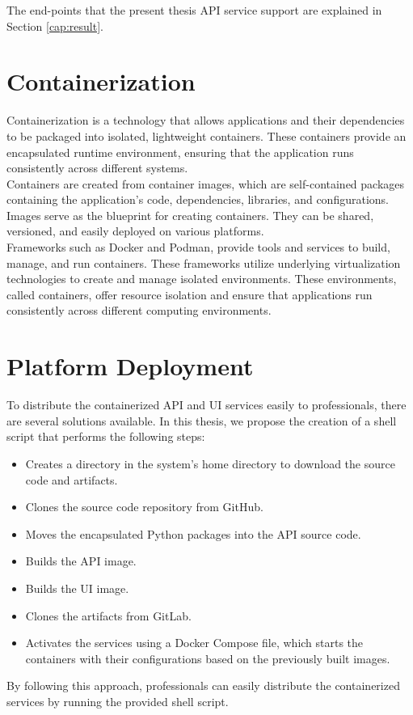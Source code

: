 The end-points that the present thesis API service support are explained in
Section \ref{cap:result}.

\section{Containerization}

Containerization is a technology that allows applications and their
dependencies to be packaged into isolated, lightweight containers. These
containers provide an encapsulated runtime environment, ensuring that the
application runs consistently across different systems. \\

Containers are created from container images, which are self-contained packages
containing the application's code, dependencies, libraries, and configurations.
Images serve as the blueprint for creating containers. They can be shared,
versioned, and easily deployed on various platforms. \\

Frameworks such as Docker and Podman, provide tools and services to build,
manage, and run containers. These frameworks utilize underlying virtualization
technologies to create and manage isolated environments. These environments,
called containers, offer resource isolation and ensure that applications run
consistently across different computing environments.

\section{Platform Deployment}

To distribute the containerized API and UI services easily to professionals,
there are several solutions available. In this thesis, we propose the creation
of a shell script that performs the following steps:

\begin{itemize}
  \item Creates a directory in the system's home directory to download the source code and artifacts.
  \item Clones the source code repository from GitHub.
  \item Moves the encapsulated Python packages into the API source code.
  \item Builds the API image.
  \item Builds the UI image.
  \item Clones the artifacts from GitLab.
  \item Activates the services using a Docker Compose file, which starts the containers with their configurations based on the previously built images.
\end{itemize}

By following this approach, professionals can easily distribute the
containerized services by running the provided shell script.
